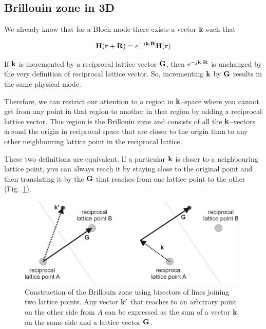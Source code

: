 \subsection{Brillouin zone in 3D}

We already know that for a Bloch mode there exists a vector ${\bf k}$ such that

\begin{equation}
{\bf H} ({\bf r}+ {\bf R}) = e^{-j {\bf k} \cdot {\bf R}} {\bf H} ({\bf r})
\end{equation} 

If ${\bf k}$ is incremented by a reciprocal lattice vector ${\bf G}$, then $e^{-j {\bf k} \cdot {\bf R}}$ is unchanged by the very definition of reciprocal lattice vector. So, incrementing ${\bf k}$ by ${\bf G}$ results in the same physical mode.

Therefore, we can restrict our attention to a region in ${\bf k}$--space where you cannot get from any point in that region to another in that region by adding a reciprocal lattice vector. This region is the Brillouin zone and consists of all the ${\bf k}$--vectors around the origin in reciprocal space that are closer to the origin than to any other neighbouring lattice point in the reciprocal lattice.

These two definitions are equivalent. If a particular ${\bf k}$ is closer to a neighbouring lattice point, you can always reach it by staying close to the original point and then translating it by the ${\bf G}$ that reaches from one lattice point to the other (Fig.~\ref{fig-bril-bisector}).

\begin{figure}
\centering
\includegraphics[width=11cm]{periodic/figures/bisector}
\caption{Construction of the Brillouin zone using bisectors of lines joining two lattice points. Any vector ${\bf k}'$ that reaches to an arbitrary point on the other side from $A$ can be expressed as the sum of a vector ${\bf k}$ on the same side and a lattice vector ${\bf G}$.}
\label{fig-bril-bisector}
\end{figure}

